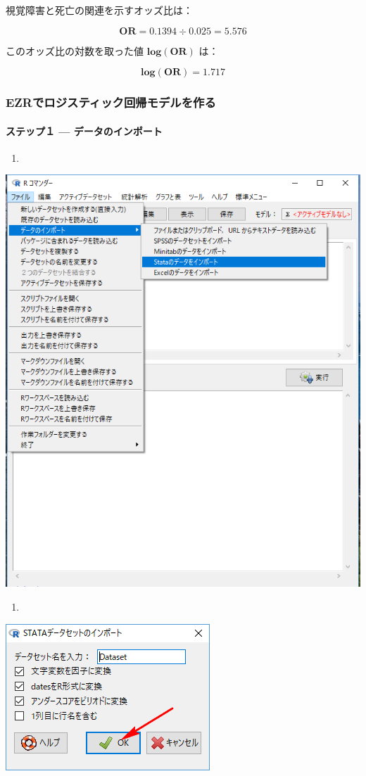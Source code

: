 \documentclass[]{problemset}
\let\oldparagraph\paragraph
\renewcommand{\paragraph}[1]{\oldparagraph{#1}\mbox{}}
\begin{document}
視覚障害と死亡の関連を示すオッズ比は：

\[
\mathbf{OR} = 0.1394 \div 0.025 = 5.576
\]

このオッズ比の対数を取った値 \(\mathbf{log(OR)}\) は：

\[
\mathbf{log(OR)} = 1.717
\]

\hypertarget{ezr}{%
\subsubsection{EZRでロジスティック回帰モデルを作る}\label{ezr}}

\hypertarget{-}{%
\paragraph{ステップ１ --- データのインポート}\label{-}}

\begin{enumerate}
\def\labelenumi{\arabic{enumi}.}
\item
\end{enumerate}

\begin{center}\includegraphics[width=0.5\linewidth]{pic/import00} \end{center}

\newpage
\vfill

\begin{enumerate}
\def\labelenumi{\arabic{enumi}.}
\setcounter{enumi}{1}
\item
\end{enumerate}

\begin{center}\includegraphics[width=0.3\linewidth]{pic/logstic01} \end{center}
\end{document}
